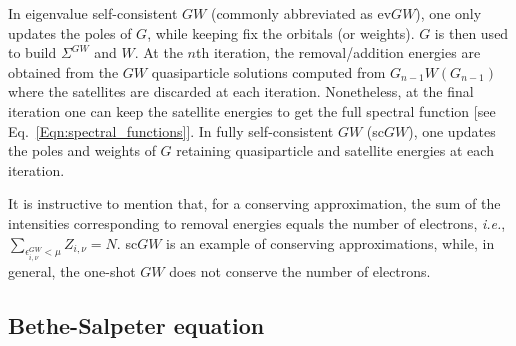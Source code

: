 \documentclass[aps,prb,reprint,superscriptaddress]{revtex4-1}
\newcommand{\Nel}{N}
\newcommand{\eps}{\epsilon}
\newcommand{\ie}{\textit{i.e.}}
\begin{document}
In eigenvalue self-consistent $GW$ (commonly abbreviated as ev$GW$), \citep{Hybertsen_1986,Shishkin_2007,Blase_2011,Faber_2011,Rangel_2016,Gui_2018} one only updates the poles of $G$, while keeping fix the orbitals (or weights). $G$ is then used to build $\Sigma^{GW}$ and $W$. At the $n$th iteration, the removal/addition energies are obtained from the $GW$ quasiparticle solutions computed from $G_{n-1}W(G_{n-1})$ where the satellites are discarded at each iteration. Nonetheless, at the final iteration one can keep the satellite energies to get the full spectral function [see Eq.~\eqref{Eqn:spectral_functions}]. In fully self-consistent $GW$ (sc$GW$),  \citep{Caruso_2012,Caruso_2013, Caruso_2013a,Caruso_2013b,Koval_2014} one updates the poles and weights of $G$ retaining quasiparticle and satellite energies at each iteration. 

It is instructive to mention that, for a conserving approximation, the sum of the intensities corresponding to removal energies equals the number of electrons, \ie, $\sum_{\eps_{i,\nu}^{GW}<\mu} Z_{i,\nu}=\Nel$. sc$GW$ is an example of conserving approximations, while, in general, the one-shot $GW$ does not conserve the number of electrons.


\subsection{Bethe-Salpeter equation}

\end{document}
